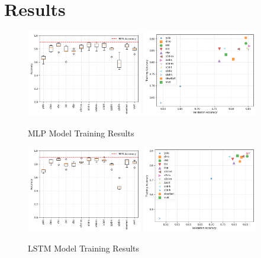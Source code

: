 \section{Results}



\begin{figure}[!htb]
    \centering
    \begin{minipage}{0.48\textwidth}
        \centering
        \includegraphics[width=0.45\textwidth]{../../assets/figures/mlp.training-results.boxplot.png}
        \includegraphics[width=0.45\textwidth]{../../assets/figures/mlp.training-results.scatter.png}
        \caption{MLP Model Training Results}
        \label{fig:mlp-training-results}
    \end{minipage}
    \hfill
    \begin{minipage}{0.48\textwidth}
        \centering
        \includegraphics[width=0.45\textwidth]{../../assets/figures/lstm.training-results.boxplot.png}
        \includegraphics[width=0.45\textwidth]{../../assets/figures/lstm.training-results.scatter.png}
        \caption{LSTM Model Training Results}
        \label{fig:lstm-training-results}
    \end{minipage}
\end{figure}

